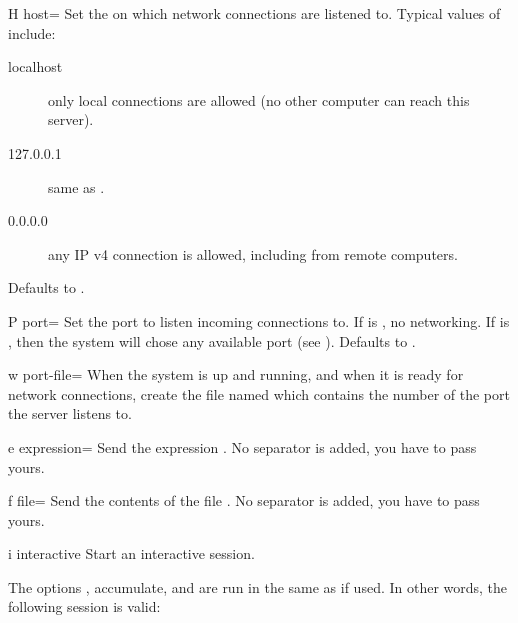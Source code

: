 \begin{options}[Networking]
\item[H]{host=} Set the  on which network
  connections are listened to.  Typical values of 
  include:
  \begin{sublist}
    \begin{description}
    \item[localhost] only local connections are allowed (no other
      computer can reach this server).
    \item[127.0.0.1] same as .
    \item[0.0.0.0] any IP v4 connection is allowed, including from
      remote computers.
  \end{description}
  \end{sublist}
  Defaults to .
\item[P]{port=} Set the port to listen incoming
  connections to.  If  is , no networking.  If
   is , then the system will chose any available
  port (see ).  Defaults to .
\item[w]{port-file=} When the system is up and running,
  and when it is ready for network connections, create the file named
   which contains the number of the port the server listens
  to.
\end{options}


\begin{options}[Execution]
\item[e]{expression=} Send the \us expression .
  No separator is added, you have to pass yours.
\item[f]{file=} Send the contents of the file .
  No separator is added, you have to pass yours.
\item[i]{interactive} Start an interactive session.
\end{options}

The options ,  accumulate, and are run in the
same  as  if used.  In other words, the
following session is valid:


